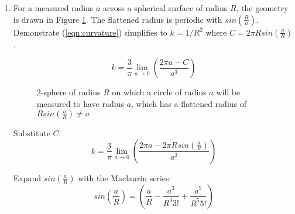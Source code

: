 \documentclass{paper}
\begin{document}
\begin{enumerate}
   \item %
     For a measured radius \(a\) across a spherical surface of radius \(R\),
     the geometry is drawn in Figure \ref{fig:sphere}. The flattened radius
     is periodic with \(sin \left(\frac{R}{a}\right)\). Demonstrate 
     (\ref{eqn:curvature}) simplifies to \(k = 1/R^2\) where 
     \(C=2 \pi R sin \left(\frac{a}{R}\right)\).

     \begin{equation}
       k = \frac{3}{\pi} \lim_{a \to 0} \left( \frac{2 \pi a - C}{a^3} \right)
       \label{eqn:curvature}
     \end{equation}

     \begin{figure}
        \begin{center}
        \end{center}

        \caption{2-sphere of radius \(R\) on which a circle of radius \(a\) 
          will be measured to have radius \(a\), which has a flattened radius 
          of \(R sin \left( \frac{a}{R} \right) \neq a\)}
        \label{fig:sphere}
     \end{figure}

     Substitute \(C\):
       \[ k = \frac{3}{\pi} \lim_{a \to 0} \left( \frac{2 \pi a - 
         2 \pi R sin \left(\frac{a}{R}\right)}{a^3} \right) \]

     Expand \(sin \left(\frac{a}{R}\right)\) with the Maclaurin series:
       \[ sin \left(\frac{a}{R}\right) = \left( \frac{a}{R} 
         - \frac{a^3}{R^3 3!} + \frac{a^5}{R^5 5!} \right) \]


\end{enumerate}
\end{document}
